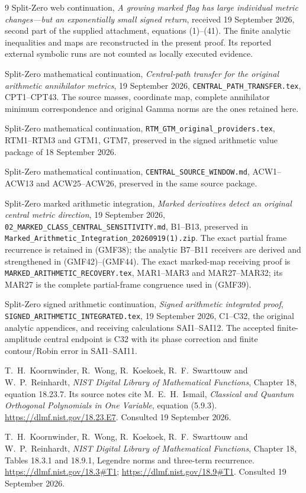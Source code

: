 \documentclass[11pt]{article}
\begin{document}
\begin{thebibliography}{9}
Split-Zero web continuation, \emph{A growing marked flag has
large individual metric changes---but an exponentially small
signed return}, received 19 September 2026, second part of
the supplied attachment, equations (1)--(41).
The finite analytic inequalities and maps are reconstructed
in the present proof.  Its reported external symbolic runs
are not counted as locally executed evidence.

Split-Zero mathematical continuation,
\emph{Central-path transfer for the original arithmetic
annihilator metrics}, 19 September 2026,
\texttt{CENTRAL\_PATH\_TRANSFER.tex}, CPT1--CPT43.
The source masses, coordinate map, complete annihilator
minimum correspondence and original Gamma norms are the
ones retained here.

Split-Zero mathematical continuation,
\texttt{RTM\_GTM\_original\_providers.tex},
RTM1--RTM3 and GTM1, GTM7, preserved in the signed arithmetic
value package of 18 September 2026.

Split-Zero mathematical continuation,
\texttt{CENTRAL\_SOURCE\_WINDOW.md}, ACW1--ACW13 and
ACW25--ACW26, preserved in the same source package.

Split-Zero marked arithmetic integration,
\emph{Marked derivatives detect an original central metric
direction}, 19 September 2026,
\texttt{02\_MARKED\_CLASS\_CENTRAL\_SENSITIVITY.md},
B1--B13, preserved in
\texttt{Marked\_Arithmetic\_Integration\_20260919(1).zip}.
The exact partial frame recurrence is retained in (GMF38);
the analytic B7--B11 receivers are derived and strengthened
in (GMF42)--(GMF44).
The exact marked-map receiving proof is
\texttt{MARKED\_ARITHMETIC\_RECOVERY.tex},
MAR1--MAR3 and MAR27--MAR32; its MAR27 is the complete
partial-frame congruence used in (GMF39).

Split-Zero signed arithmetic continuation,
\emph{Signed arithmetic integrated proof},
\texttt{SIGNED\_ARITHMETIC\_INTEGRATED.tex},
19 September 2026, C1--C32, the original analytic
appendices, and receiving calculations SAI1--SAI12.
The accepted finite-amplitude central endpoint is C32
with its phase correction and finite contour/Robin
error in SAI1--SAI11.

T.\ H.\ Koornwinder, R.\ Wong, R.\ Koekoek,
R.\ F.\ Swarttouw and W.\ P.\ Reinhardt,
\emph{NIST Digital Library of Mathematical Functions},
Chapter 18, equation 18.23.7.
Its source notes cite M.\ E.\ H.\ Ismail,
\emph{Classical and Quantum Orthogonal Polynomials in One
Variable}, equation (5.9.3).
\url{https://dlmf.nist.gov/18.23.E7}.
Consulted 19 September 2026.

T.\ H.\ Koornwinder, R.\ Wong, R.\ Koekoek,
R.\ F.\ Swarttouw and W.\ P.\ Reinhardt,
\emph{NIST Digital Library of Mathematical Functions},
Chapter 18, Tables 18.3.1 and 18.9.1,
Legendre norms and three-term recurrence.
\url{https://dlmf.nist.gov/18.3#T1};
\url{https://dlmf.nist.gov/18.9#T1}.
Consulted 19 September 2026.

\end{thebibliography}
\end{document}
